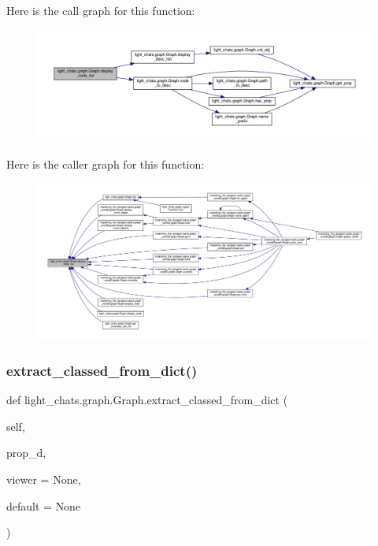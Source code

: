Here is the call graph for this function\+:
\nopagebreak
\begin{figure}[H]
\begin{center}
\leavevmode
\includegraphics[width=350pt]{classlight__chats_1_1graph_1_1Graph_a9c3ce0d845610e465f9a5d9bee1cbd23_cgraph}
\end{center}
\end{figure}
Here is the caller graph for this function\+:
\nopagebreak
\begin{figure}[H]
\begin{center}
\leavevmode
\includegraphics[width=350pt]{classlight__chats_1_1graph_1_1Graph_a9c3ce0d845610e465f9a5d9bee1cbd23_icgraph}
\end{center}
\end{figure}
\mbox{\label{classlight__chats_1_1graph_1_1Graph_a4b2f6d6d7714ea3b82ff7a01f3199123}} 
\subsubsection{\texorpdfstring{extract\+\_\+classed\+\_\+from\+\_\+dict()}{extract\_classed\_from\_dict()}}
{\footnotesize\ttfamily def light\+\_\+chats.\+graph.\+Graph.\+extract\+\_\+classed\+\_\+from\+\_\+dict (\begin{DoxyParamCaption}\item[{}]{self,  }\item[{}]{prop\+\_\+d,  }\item[{}]{viewer = {\ttfamily None},  }\item[{}]{default = {\ttfamily None} }\end{DoxyParamCaption})}



